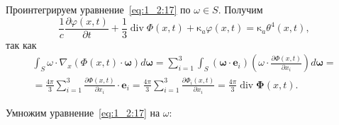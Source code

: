 Проинтегрируем уравнение~\eqref{eq:1_2:17} по $\omega \in S$.
Получим
\begin{equation}
    \label{eq:1_2:18}
    \frac{1}{c} \frac{\partial \varphi(x, t)}{\partial t}
    + \frac{1}{3} \operatorname{div} \Phi(x, t)
    + \mathrm{\kappa}_{a} \varphi(x, t)
    = \mathrm{\kappa}_{a} \theta^{4}(x, t),
\end{equation}
так как
\[
    \begin{gathered}
        \int_{S} \omega \cdot \nabla_{x}(\Phi(x, t)
        \cdot \boldsymbol{\omega}) d \boldsymbol{\omega}=\sum_{i=1}^{3}
        \int_{S}\left(\boldsymbol{\omega}
        \cdot \mathbf{e}_{i}\right)\left(\omega \cdot
        \frac{\partial \Phi(x, t)}{\partial x_{i}}\right) d \boldsymbol{\omega} = \\
        = \frac{4 \pi}{3} \sum_{i=1}^{3} \frac{\partial \Phi(x, t)}{\partial x_{i}} \cdot
        \mathbf{e}_{i}=\frac{4 \pi}{3} \sum_{i=1}^{3}
        \frac{\partial \Phi_{i}(x, t)}{\partial x_{i}}=
        \frac{4 \pi}{3} \operatorname{div} \boldsymbol{\Phi}(x, t).
    \end{gathered}
\]

Умножим уравнение~\eqref{eq:1_2:17} на $\omega:$

